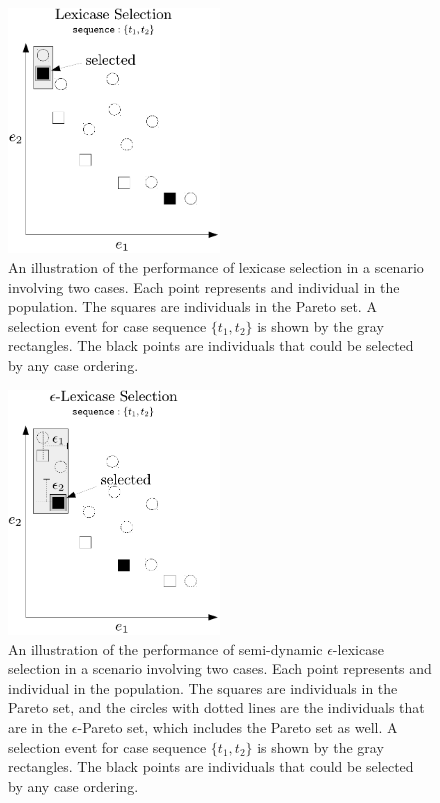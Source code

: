 \documentclass[preprint]{article}
\begin{document}
\begin{figure}

\centering
  \includegraphics[width = 0.5\textwidth]{figs/lex_pareto.pdf}
  \caption{An illustration of the performance of lexicase selection in a scenario involving two cases. Each point represents and individual in the population. The squares are individuals in the Pareto set. A selection event for case sequence $\{t_1,t_2\}$ is shown by the gray rectangles. The black points are individuals that could be selected by any case ordering.}\label{fig:lex_pareto}
\end{figure}
\begin{figure}
\centering
  \includegraphics[width = 0.5\textwidth]{figs/ep-lex_pareto.pdf}
  \caption{An illustration of the performance of semi-dynamic $\epsilon$-lexicase selection in a scenario involving two cases. Each point represents and individual in the population. The squares are individuals in the Pareto set, and the circles with dotted lines are the individuals that are in the $\epsilon$-Pareto set, which includes the Pareto set as well. A selection event for case sequence $\{t_1,t_2\}$ is shown by the gray rectangles. The black points are individuals that could be selected by any case ordering.}\label{fig:ep-lex_pareto}
\end{figure}
\end{document}
